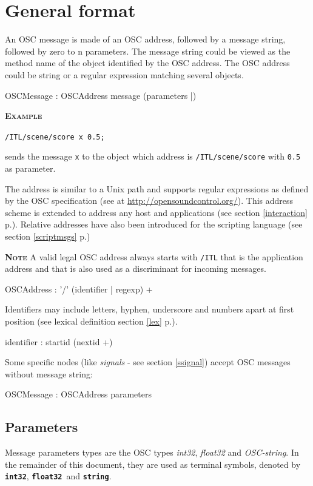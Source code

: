 \documentclass[a4paper,twoside]{report}
\newcommand{\toplevel}[1]	{\chapter{#1}}
\newcommand{\sublevel}[1]	{\section{#1}}
\newcommand{\fullref}[1]	{\ref{#1} p.\pageref{#1}}
\newcommand{\OSC}[1]		{\texttt{#1}}
\newcommand{\example}		{\textbf{\hspace{-1.5cm}\textbf{\textsc{Example }}}}
\newcommand{\note}	[1]		{\vspace{2mm}\textbf{\hspace{-0.9cm}\textbf{\textsc{Note #1}}}}
\newcommand{\osctype}[1]	{\textbf{\texttt{{\small #1}}}}
\newcommand{\oscint}		{\osctype{int32}}
\newcommand{\oscfloat}		{\osctype{float32}}
\newcommand{\oscstring}		{\osctype{string}}
\newcommand{\sample}	[1]			{\vspace{-2mm}\begin{center}\colorbox{mygrey}{
								\begin{minipage}[t]{0.9\columnwidth} 
								{\small \texttt{#1}}
								\end{minipage}}\end{center}}
\begin{document}
\newpage

\setcounter{page}{1}

\toplevel{General format}
\label{genformat}
An OSC message is made of an OSC address, followed by a message string, followed by zero to n parameters. The message string could be viewed as the method name of the object identified by the OSC address.
The OSC address could be string or a regular expression matching several objects.
\begin{rail}
OSCMessage : OSCAddress message (parameters |)
\end{rail}
\example
\sample{/ITL/scene/score x 0.5;}
sends the message \OSC{x} to the object which address is \OSC{/ITL/scene/score} with \OSC{0.5} as parameter.

The address is similar to a Unix path and supports regular expressions as defined by the OSC specification (see at \url{http://opensoundcontrol.org/}). This address scheme is extended to address any host and applications (see section \fullref{interaction}). Relative addresses have also been introduced for the scripting language (see section \fullref{scriptmsgs})

\note{} A valid legal OSC address always starts with \OSC{/ITL} that is the application address and that is also used as a discriminant for incoming messages.
\begin{rail}
OSCAddress : '/' (identifier | regexp) +
\end{rail}

Identifiers may include letters, hyphen, underscore and numbers apart at first position (see lexical definition section \fullref{lex}).
\railalias{nextid}{[-\_a-zA-Z0-9]]}
\begin{rail}
identifier : startid (nextid +)
\end{rail}

Some specific nodes (like \emph{signals} - see section \ref{ssignal}) accept OSC messages without message string:
\begin{rail}
OSCMessage : OSCAddress parameters
\end{rail}

\sublevel{Parameters}

Message parameters types are the OSC types \emph{int32}, \emph{float32} and \emph{OSC-string}. In the remainder of this document, they are used as terminal symbols, denoted by \oscint, \oscfloat\ and \oscstring. 
\end{document}
